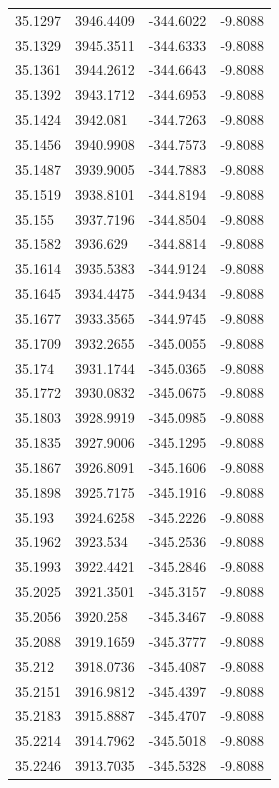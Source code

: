 \begin{table}[H]
\begin{tabular}{llll}
35.1297 & 3946.4409 & -344.6022 & -9.8088 \\
35.1329 & 3945.3511 & -344.6333 & -9.8088 \\
35.1361 & 3944.2612 & -344.6643 & -9.8088 \\
35.1392 & 3943.1712 & -344.6953 & -9.8088 \\
35.1424 & 3942.081 & -344.7263 & -9.8088 \\
35.1456 & 3940.9908 & -344.7573 & -9.8088 \\
35.1487 & 3939.9005 & -344.7883 & -9.8088 \\
35.1519 & 3938.8101 & -344.8194 & -9.8088 \\
35.155 & 3937.7196 & -344.8504 & -9.8088 \\
35.1582 & 3936.629 & -344.8814 & -9.8088 \\
35.1614 & 3935.5383 & -344.9124 & -9.8088 \\
35.1645 & 3934.4475 & -344.9434 & -9.8088 \\
35.1677 & 3933.3565 & -344.9745 & -9.8088 \\
35.1709 & 3932.2655 & -345.0055 & -9.8088 \\
35.174 & 3931.1744 & -345.0365 & -9.8088 \\
35.1772 & 3930.0832 & -345.0675 & -9.8088 \\
35.1803 & 3928.9919 & -345.0985 & -9.8088 \\
35.1835 & 3927.9006 & -345.1295 & -9.8088 \\
35.1867 & 3926.8091 & -345.1606 & -9.8088 \\
35.1898 & 3925.7175 & -345.1916 & -9.8088 \\
35.193 & 3924.6258 & -345.2226 & -9.8088 \\
35.1962 & 3923.534 & -345.2536 & -9.8088 \\
35.1993 & 3922.4421 & -345.2846 & -9.8088 \\
35.2025 & 3921.3501 & -345.3157 & -9.8088 \\
35.2056 & 3920.258 & -345.3467 & -9.8088 \\
35.2088 & 3919.1659 & -345.3777 & -9.8088 \\
35.212 & 3918.0736 & -345.4087 & -9.8088 \\
35.2151 & 3916.9812 & -345.4397 & -9.8088 \\
35.2183 & 3915.8887 & -345.4707 & -9.8088 \\
35.2214 & 3914.7962 & -345.5018 & -9.8088 \\
35.2246 & 3913.7035 & -345.5328 & -9.8088 \\

\end{tabular}
\end{table}
